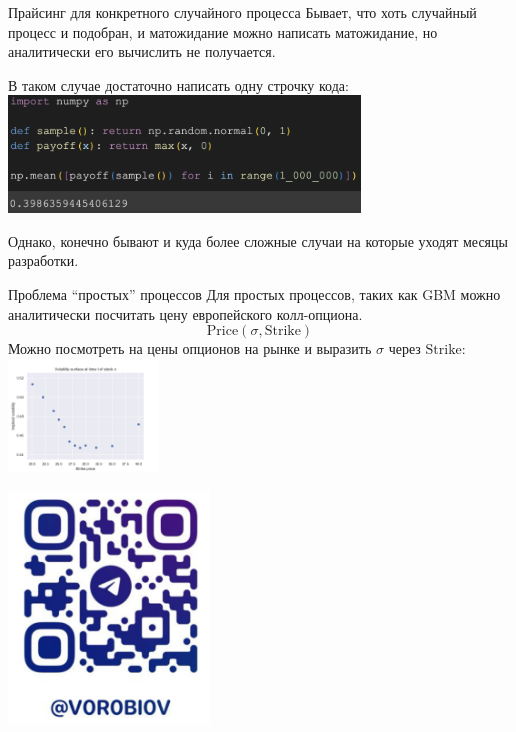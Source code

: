 \documentclass{beamer}
\newcommand{\quotes}[1]{``#1''}
\begin{document}
    \begin{frame}{Прайсинг для конкретного случайного процесса}
        Бывает, что хоть случайный процесс и подобран, и матожидание можно написать матожидание, но аналитически его вычислить не получается.

        В таком случае достаточно написать одну строчку кода:
        \includegraphics[width=0.7\textwidth]{code.png}

        Однако, конечно бывают и куда более сложные случаи на которые уходят месяцы разработки.

    \end{frame}

    \begin{frame}{Проблема \quotes{простых} процессов}
        Для простых процессов, таких как GBM можно аналитически посчитать цену европейского колл-опциона.
        \[
            \mathrm{Price}\left(\sigma, \mathrm{Strike}\right)
        \]
        Можно посмотреть на цены опционов на рынке и выразить $\sigma$ через $\mathrm{Strike}$:
        \includegraphics[width=0.3\textwidth]{implied.png}
    \end{frame}

    \begin{frame}
        \center
        \includegraphics[width=0.4\textwidth]{me.png}
    \end{frame}
\end{document}
